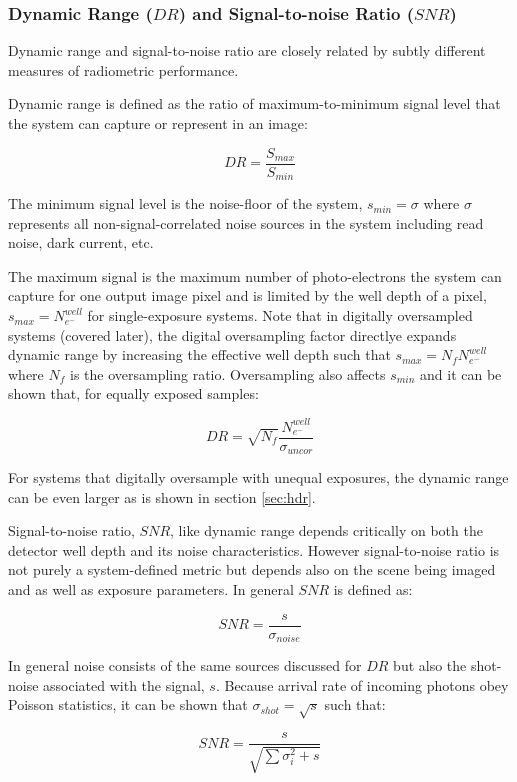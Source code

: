 \documentclass[10pt,journal]{IEEEtran}  %
\begin{document}
\subsubsection{Dynamic Range ($DR$) and Signal-to-noise Ratio ($SNR$)}
Dynamic range and signal-to-noise ratio are closely related by subtly different measures of radiometric performance.

Dynamic range is defined as the ratio of maximum-to-minimum signal level that the system can capture or represent in an image:

$$DR = \frac{S_{max}}{S_{min}}$$

The minimum signal level is the noise-floor of the system, $s_{min} = \sigma$ where $\sigma$ represents all non-signal-correlated noise sources in the system including read noise, dark current, etc.

The maximum signal is the maximum number of photo-electrons the system can capture for one output image pixel and is limited by the well depth of a pixel, $s_{max} = N_{e^-}^{well}$ for single-exposure systems.  Note that in digitally oversampled systems (covered later), the digital oversampling factor directlye expands dynamic range by increasing the effective well depth such that $s_{max} = N_f N_{e^-}^{well}$ where $N_f$ is the oversampling ratio.  Oversampling also affects $s_{min}$ and it can be shown that, for equally exposed samples:

\begin{equation}
    DR = \sqrt{N_f}\frac{N_{e^-}^{well}}{\sigma_{uncor}}
\label{eq:DR_OS}
\end{equation}

For systems that digitally oversample with unequal exposures, the dynamic range can be even larger as is shown in section \ref{sec:hdr}.

Signal-to-noise ratio, $SNR$, like dynamic range depends critically on both the detector well depth and its noise characteristics.  However signal-to-noise ratio is not purely a system-defined metric but depends also on the scene being imaged and as well as exposure parameters.  In general $SNR$ is defined as:

$$SNR = \frac{s}{\sigma_{noise}}$$

In general noise consists of the same sources discussed for $DR$ but also the shot-noise associated with the signal, $s$.  Because arrival rate of incoming photons obey Poisson statistics, it can be shown that $\sigma_{shot} = \sqrt{s}$ such that:

$$SNR = \frac{s}{\sqrt{\sum{\sigma_i^2} + s}}$$
\end{document}
